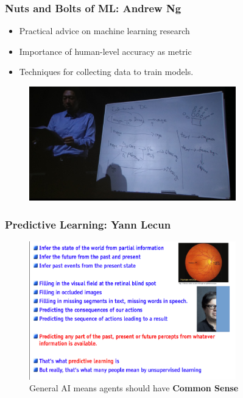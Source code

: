 \documentclass[11pt,
               hyperref={colorlinks,citecolor=pink,linkcolor=red,urlcolor=blue}
               ]{beamer}
\begin{document}
  \begin{frame}
    \frametitle{Nuts and Bolts of ML: Andrew Ng}

    \begin{itemize}
      \item Practical advice on machine learning research
      \item Importance of human-level accuracy as metric
      \item Techniques for collecting data to train models.
    \end{itemize}

    \begin{figure}
      \centering
      \includegraphics[width=0.8\textwidth]{ngKeynote.jpg}
    \end{figure}

  \end{frame}

  \begin{frame}
    \frametitle{Predictive Learning: Yann Lecun}

    \begin{figure}
      \centering
      \caption*{General AI means agents should have \textbf{Common Sense}\footnotemark[1]}
      \includegraphics[width=0.8\textwidth]{generalAI2.png}
    \end{figure}

  \end{frame}
\end{document}

